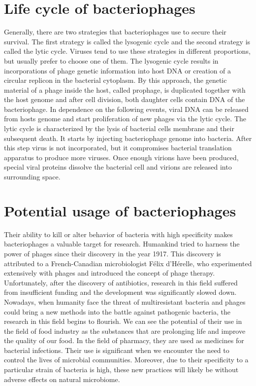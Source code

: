 \section{Life cycle of bacteriophages}
Generally, there are two strategies that bacteriophages use to secure their survival.
The first strategy is called the lysogenic cycle and the second strategy is called the lytic cycle.
Viruses tend to use these strategies in different proportions, but usually prefer to choose one of them.
The lysogenic cycle results in incorporations of phage genetic information into host DNA or creation of a circular replicon in the bacterial cytoplasm.
By this approach, the genetic material of a phage inside the host, called prophage, is duplicated together with the host genome and after cell division, both daughter cells contain DNA of the bacteriophage.
In dependence on the following events, viral DNA can be released from hosts genome and start proliferation of new phages via the lytic cycle.
The lytic cycle is characterized by the lysis of bacterial cells membrane and their subsequent death.
It starts by injecting bacteriophage genome into bacteria.
After this step virus is not incorporated, but it compromises bacterial translation apparatus to produce more viruses.
Once enough virions have been produced, special viral proteins dissolve the bacterial cell and virions are released into surrounding space.

\section{Potential usage of bacteriophages}
Their ability to kill or alter behavior of bacteria with high specificity makes bacteriophages a valuable target for research.
Humankind tried to harness the power of phages since their discovery in the year 1917.
This discovery is attributed to a French-Canadian microbiologist Félix d'Hérelle, who experimented extensively with phages and introduced the concept of phage therapy\cite{phages_in_nature}.
Unfortunately, after the discovery of antibiotics, research in this field suffered from insufficient funding and the development was significantly slowed down.\\
Nowadays, when humanity face the threat of multiresistant bacteria and phages could bring a new methods into the battle against pathogenic bacteria, the research in this field begins to flourish.
We can see the potential of their use in the field of food industry as the substances that are prolonging life and improve the quality of our food. In the field of pharmacy, they are used as medicines for bacterial infections. Their use is significant when we encounter the need to control the lives of microbial communities.
Moreover, due to their specificity to a particular strain of bacteria is high, these new practices will likely be without adverse effects on natural microbiome.

